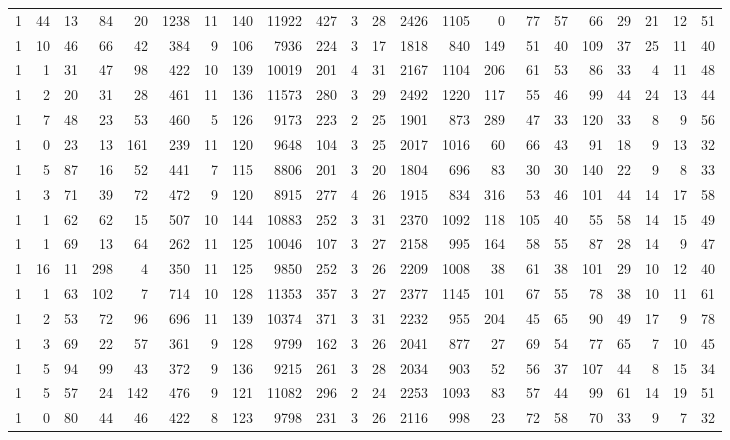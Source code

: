 {\begin{landscape}
\begin{longtable}[c]{lrrrrrrrrrrrrrrrrrrrrr}
1 & 44 & 13 & 84 & 20 & 1238 & 11 & 140 & 11922 & 427 & 3 & 28 & 2426 & 1105 & 0 & 77 & 57 & 66 & 29 & 21 & 12 & 51 \\
1 & 10 & 46 & 66 & 42 & 384 & 9 & 106 & 7936 & 224 & 3 & 17 & 1818 & 840 & 149 & 51 & 40 & 109 & 37 & 25 & 11 & 40 \\
1 & 1 & 31 & 47 & 98 & 422 & 10 & 139 & 10019 & 201 & 4 & 31 & 2167 & 1104 & 206 & 61 & 53 & 86 & 33 & 4 & 11 & 48 \\
1 & 2 & 20 & 31 & 28 & 461 & 11 & 136 & 11573 & 280 & 3 & 29 & 2492 & 1220 & 117 & 55 & 46 & 99 & 44 & 24 & 13 & 44 \\
1 & 7 & 48 & 23 & 53 & 460 & 5 & 126 & 9173 & 223 & 2 & 25 & 1901 & 873 & 289 & 47 & 33 & 120 & 33 & 8 & 9 & 56 \\
1 & 0 & 23 & 13 & 161 & 239 & 11 & 120 & 9648 & 104 & 3 & 25 & 2017 & 1016 & 60 & 66 & 43 & 91 & 18 & 9 & 13 & 32 \\
1 & 5 & 87 & 16 & 52 & 441 & 7 & 115 & 8806 & 201 & 3 & 20 & 1804 & 696 & 83 & 30 & 30 & 140 & 22 & 9 & 8 & 33 \\
1 & 3 & 71 & 39 & 72 & 472 & 9 & 120 & 8915 & 277 & 4 & 26 & 1915 & 834 & 316 & 53 & 46 & 101 & 44 & 14 & 17 & 58 \\
1 & 1 & 62 & 62 & 15 & 507 & 10 & 144 & 10883 & 252 & 3 & 31 & 2370 & 1092 & 118 & 105 & 40 & 55 & 58 & 14 & 15 & 49 \\
1 & 1 & 69 & 13 & 64 & 262 & 11 & 125 & 10046 & 107 & 3 & 27 & 2158 & 995 & 164 & 58 & 55 & 87 & 28 & 14 & 9 & 47 \\
1 & 16 & 11 & 298 & 4 & 350 & 11 & 125 & 9850 & 252 & 3 & 26 & 2209 & 1008 & 38 & 61 & 38 & 101 & 29 & 10 & 12 & 40 \\
1 & 1 & 63 & 102 & 7 & 714 & 10 & 128 & 11353 & 357 & 3 & 27 & 2377 & 1145 & 101 & 67 & 55 & 78 & 38 & 10 & 11 & 61 \\
1 & 2 & 53 & 72 & 96 & 696 & 11 & 139 & 10374 & 371 & 3 & 31 & 2232 & 955 & 204 & 45 & 65 & 90 & 49 & 17 & 9 & 78 \\
1 & 3 & 69 & 22 & 57 & 361 & 9 & 128 & 9799 & 162 & 3 & 26 & 2041 & 877 & 27 & 69 & 54 & 77 & 65 & 7 & 10 & 45 \\
1 & 5 & 94 & 99 & 43 & 372 & 9 & 136 & 9215 & 261 & 3 & 28 & 2034 & 903 & 52 & 56 & 37 & 107 & 44 & 8 & 15 & 34 \\
1 & 5 & 57 & 24 & 142 & 476 & 9 & 121 & 11082 & 296 & 2 & 24 & 2253 & 1093 & 83 & 57 & 44 & 99 & 61 & 14 & 19 & 51 \\
1 & 0 & 80 & 44 & 46 & 422 & 8 & 123 & 9798 & 231 & 3 & 26 & 2116 & 998 & 23 & 72 & 58 & 70 & 33 & 9 & 7 & 32 \\

\end{longtable}
\end{landscape}}
